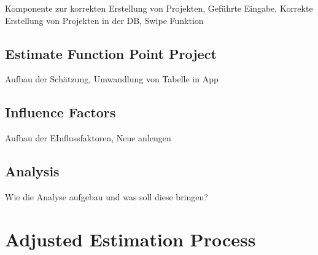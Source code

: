 Komponente zur korrekten Erstellung von Projekten, Geführte Eingabe, Korrekte Erstellung von Projekten in der DB, Swipe Funktion

\subsection{Estimate Function Point Project}

Aufbau der Schätzung, Umwandlung von Tabelle in App

\subsection{Influence Factors}

Aufbau der EInflussfaktoren, Neue anlengen

\subsection{Analysis}

Wie die Analyse aufgebau und was soll diese bringen?

\section{Adjusted Estimation Process}



